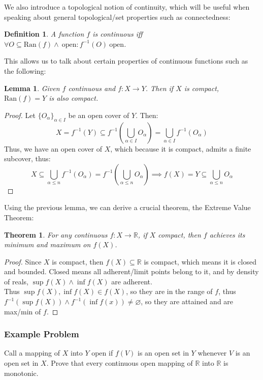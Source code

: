 \documentclass[10pt,letterpaper]{article} %
\newtheorem{thm}{Theorem}[section]
\newtheorem{lem}{Lemma}[section]
\newtheorem{defn}{Definition}[section]
\begin{document}
\medskip
We also introduce a topological notion of continuity, which will be useful when speaking about general topological/set properties such as connectedness:
\begin{defn}
A function $f$ is continuous iff $\forall O \subseteq \text{Ran}(f) \land \ \text{open}: f^{-1}(O) \ \text{open}$.
\end{defn}

This allows us to talk about certain properties of continuous functions such as the following:
\begin{lem}
Given $f$ continuous and $f: X \xrightarrow{} Y$. Then if $X$ is compact, $\text{Ran}(f) = Y$ is also compact.
\end{lem}
\begin{proof}
Let $\{O_\alpha\}_{\alpha \in I}$ be an open cover of $Y$. Then:
\begin{equation*}
  X = f^{-1}(Y) \subseteq f^{-1}\left(\bigcup_{\alpha \in I}O_\alpha\right) = \bigcup_{\alpha \in I}f^{-1}(O_\alpha)
\end{equation*}
Thus, we have an open cover of $X$, which because it is compact, admits a finite subcover, thus:
\begin{equation*}
  X \subseteq \bigcup_{\alpha \leqslant n}f^{-1}(O_\alpha) = f^{-1}\left(\bigcup_{\alpha \leqslant n}O_\alpha\right) \implies f(X) = Y \subseteq \bigcup_{\alpha \leqslant n}O_\alpha
\end{equation*}
\end{proof}

Using the previous lemma, we can derive a crucial theorem, the Extreme Value Theorem:
\begin{thm}
For any continuous $f: X \xrightarrow{} \mathbb{R}$, if $X$ compact, then $f$ achieves its minimum and maximum on $f(X)$. 
\end{thm}
\begin{proof}
Since $X$ is compact, then $f(X) \subseteq \mathbb{R}$ is compact, which means it is closed and bounded. Closed means all adherent/limit points belong to it, and by density of reals, $\sup f(X) \land \inf f(X)$ are adherent.\\

Thus $\sup f(X), \inf f(X) \in f(X)$, so they are in the range of $f$, thus $f^{-1}(\sup f(X)) \land f^{-1}(\inf f(x)) \neq \varnothing$, so they are attained and are max/min of $f$.
\end{proof}

\subsubsection{Example Problem}
Call a mapping of $X$ into $Y$ open if $f(V)$ is an open set in $Y$ whenever $V$ is an open set in $X$. Prove that every continuous open mapping of $\mathbb{R}$ into $\mathbb{R}$ is monotonic.
\end{document}
